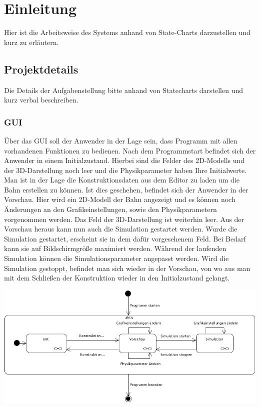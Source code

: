 
\chapter{Einleitung}
Hier ist die Arbeitsweise des Systems anhand von State-Charts darzustellen und
kurz zu erläutern.
\section{Projektdetails}
Die Details der Aufgabenstellung bitte anhand von Statecharts darstellen und
kurz verbal beschreiben.

\subsection{GUI}
Über das GUI soll der Anwender in der Lage sein, dass Programm mit allen vorhandenen Funktionen zu bedienen.
Nach dem Programmstart befindet sich der Anwender in einem Initialzustand. Hierbei sind die Felder des 2D-Modells und der 3D-Darstellung noch leer und die Physikparameter haben Ihre Initialwerte. Man ist in der Lage die Konstruktionsdaten aus dem Editor zu laden um die Bahn erstellen zu können.
Ist dies geschehen, befindet sich der Anwender in der Vorschau. Hier wird ein 2D-Modell der Bahn angezeigt und es können noch Änderungen an den Grafikeinstellungen, sowie den Physikparametern vorgenommen werden. Das Feld der 3D-Darstellung ist weiterhin leer. Aus der Vorschau heraus kann nun auch die Simulation gestartet werden.
Wurde die Simulation gestartet, erscheint sie in dem dafür vorgesehenem Feld. Bei Bedarf kann sie auf Bildschirmgröße maximiert werden. Während der laufenden Simulation können die Simulationsparameter angepasst werden.
Wird die Simulation gestoppt, befindet man sich wieder in der Vorschau, von wo aus man mit dem Schließen der Konstruktion wieder in den Initialzustand gelangt.

\includegraphics[width=\linewidth]{bilder/StateChart_GUI}

